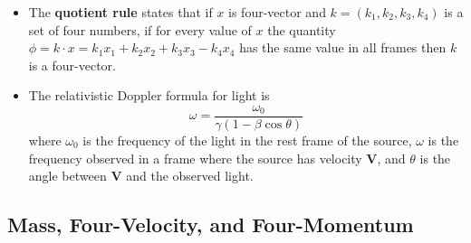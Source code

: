 \documentclass{article}
\renewcommand{\vec}[1]{\boldsymbol{\mathbf{#1}}}
\begin{document}
\begin{itemize}
  \item The \textbf{quotient rule} states that if $x$ is four-vector and $k = (k_1, k_2, k_3, k_4)$ is a set of four numbers, if for every value of $x$ the quantity $\phi = k \cdot x = k_1 x_1 + k_2 x_2 + k_3 x_3 - k_4 x_4$ has the same value in all frames then $k$ is a four-vector.

  \item The relativistic Doppler formula for light is \[\omega = \frac{\omega_0}{\gamma (1 - \beta \cos \theta)}\] where $\omega_0$ is the frequency of the light in the rest frame of the source, $\omega$ is the frequency observed in a frame where the source has velocity $\vec{V}$, and $\theta$ is the angle between $\vec{V}$ and the observed light.
\end{itemize}

\subsection{Mass, Four-Velocity, and Four-Momentum}
\end{document}
